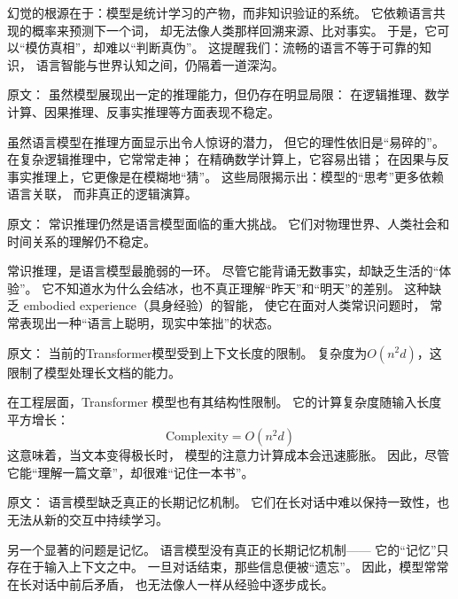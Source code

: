 幻觉的根源在于：模型是统计学习的产物，而非知识验证的系统。  
它依赖语言共现的概率来预测下一个词，  
却无法像人类那样回溯来源、比对事实。  
于是，它可以“模仿真相”，却难以“判断真伪”。  
这提醒我们：流畅的语言不等于可靠的知识，  
语言智能与世界认知之间，仍隔着一道深沟。  



原文：
虽然模型展现出一定的推理能力，但仍存在明显局限：  
在逻辑推理、数学计算、因果推理、反事实推理等方面表现不稳定。  

虽然语言模型在推理方面显示出令人惊讶的潜力，  
但它的理性依旧是“易碎的”。  
在复杂逻辑推理中，它常常走神；  
在精确数学计算上，它容易出错；  
在因果与反事实推理上，它更像是在模糊地“猜”。  
这些局限揭示出：模型的“思考”更多依赖语言关联，  
而非真正的逻辑演算。  



原文：
常识推理仍然是语言模型面临的重大挑战。  
它们对物理世界、人类社会和时间关系的理解仍不稳定。  

常识推理，是语言模型最脆弱的一环。  
尽管它能背诵无数事实，却缺乏生活的“体验”。  
它不知道水为什么会结冰，也不真正理解“昨天”和“明天”的差别。  
这种缺乏 embodied experience（具身经验）的智能，  
使它在面对人类常识问题时，  
常常表现出一种“语言上聪明，现实中笨拙”的状态。  



原文：
当前的Transformer模型受到上下文长度的限制。  
复杂度为$O(n^2 d)$，这限制了模型处理长文档的能力。  

在工程层面，Transformer 模型也有其结构性限制。  
它的计算复杂度随输入长度平方增长：  
\[
\text{Complexity} = O(n^2 d)
\]  
这意味着，当文本变得极长时，  
模型的注意力计算成本会迅速膨胀。  
因此，尽管它能“理解一篇文章”，却很难“记住一本书”。  



原文：
语言模型缺乏真正的长期记忆机制。  
它们在长对话中难以保持一致性，也无法从新的交互中持续学习。  

另一个显著的问题是记忆。  
语言模型没有真正的长期记忆机制——  
它的“记忆”只存在于输入上下文之中。  
一旦对话结束，那些信息便被“遗忘”。  
因此，模型常常在长对话中前后矛盾，  
也无法像人一样从经验中逐步成长。  



